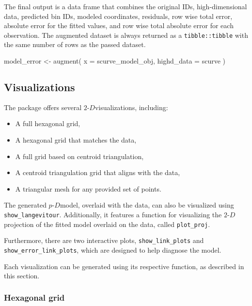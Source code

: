 \documentclass[
  11pt,
  a4paper,
]{report}
\newenvironment{Shaded}{\begin{snugshade}}{\end{snugshade}}
\newcommand{\AttributeTok}[1]{\textcolor[rgb]{0.40,0.45,0.13}{#1}}
\newcommand{\FunctionTok}[1]{\textcolor[rgb]{0.28,0.35,0.67}{#1}}
\newcommand{\NormalTok}[1]{\textcolor[rgb]{0.00,0.23,0.31}{#1}}
\newcommand{\OtherTok}[1]{\textcolor[rgb]{0.00,0.23,0.31}{#1}}
\providecommand{\tightlist}{%
  \setlength{\itemsep}{0pt}\setlength{\parskip}{0pt}}
\def\tightlist{}
\newcommand\pD{$p\text{-}D$}
\newcommand{\twoD}{$2\text{-}D$}
\begin{document}
The final output is a data frame that combines the original IDs,
high-dimensional data, predicted bin IDs, modeled coordinates,
residuals, row wise total error, absolute error for the fitted values,
and row wise total absolute error for each observation. The augmented
dataset is always returned as a \texttt{tibble::tibble} with the same
number of rows as the passed dataset.

\begin{Shaded}
\begin{Highlighting}[]
\NormalTok{model\_error }\OtherTok{\textless{}{-}} \FunctionTok{augment}\NormalTok{(}
  \AttributeTok{x =}\NormalTok{ scurve\_model\_obj,}
  \AttributeTok{highd\_data =}\NormalTok{ scurve}
\NormalTok{  )}
\end{Highlighting}
\end{Shaded}

\subsection{Visualizations}\label{visualizations}

The package offers several \twoD visualizations, including:

\begin{itemize}
\tightlist
\item
  A full hexagonal grid,
\item
  A hexagonal grid that matches the data,
\item
  A full grid based on centroid triangulation,
\item
  A centroid triangulation grid that aligns with the data,
\item
  A triangular mesh for any provided set of points.
\end{itemize}

The generated \pD model, overlaid with the data, can also be visualized
using \texttt{show\_langevitour}. Additionally, it features a function
for visualizing the \twoD projection of the fitted model overlaid on the
data, called \texttt{plot\_proj}.

Furthermore, there are two interactive plots, \texttt{show\_link\_plots}
and \texttt{show\_error\_link\_plots}, which are designed to help
diagnose the model.

Each visualization can be generated using its respective function, as
described in this section.

\subsubsection{Hexagonal grid}\label{hexagonal-grid}
\end{document}
